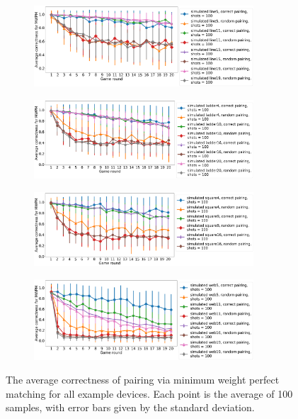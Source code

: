 \documentclass[aps,prl,twocolumn,showpacs,preprintnumbers]{revtex4-1}
\begin{document}
\begin{figure}
    \centering
    \begin{subfigure}[b]{\textwidth}
        \includegraphics[width=0.9\textwidth]{figures/line_mwpm.png}
    \end{subfigure}
    \begin{subfigure}[b]{\textwidth}
        \includegraphics[width=0.9\textwidth]{figures/ladder_mwpm.png}
    \end{subfigure}
    \begin{subfigure}[b]{\textwidth}
        \includegraphics[width=0.9\textwidth]{figures/square_mwpm.png}
    \end{subfigure}
    \begin{subfigure}[b]{\textwidth}
        \includegraphics[width=0.9\textwidth]{figures/web_mwpm.png}
    \end{subfigure}
    \caption{The average correctness of pairing via minimum weight perfect matching for all example devices. Each point is the average of 100 samples, with error bars given by the standard deviation.}\label{fig:example_mwpm}
\end{figure}
\pagebreak
\end{document}
